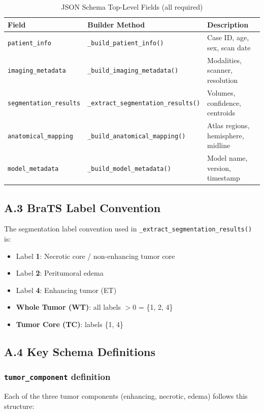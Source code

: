 \documentclass[conference]{IEEEtran}
\begin{document}
\begin{table}[htbp]
\caption{JSON Schema Top-Level Fields (all required)}
\begin{center}
\begin{tabular}{l l p{3.8cm}}
\toprule
\textbf{Field} & \textbf{Builder Method} & \textbf{Description} \\
\midrule
\texttt{patient\_info}       & \texttt{\_build\_patient\_info()}       & Case ID, age, sex, scan date \\
\texttt{imaging\_metadata}   & \texttt{\_build\_imaging\_metadata()}   & Modalities, scanner, resolution \\
\texttt{segmentation\_results} & \texttt{\_extract\_segmentation\_results()} & Volumes, confidence, centroids \\
\texttt{anatomical\_mapping} & \texttt{\_build\_anatomical\_mapping()} & Atlas regions, hemisphere, midline \\
\texttt{model\_metadata}     & \texttt{\_build\_model\_metadata()}     & Model name, version, timestamp \\
\bottomrule
\end{tabular}
\label{tab:schema_top}
\end{center}
\end{table}

\subsection*{A.3 BraTS Label Convention}

The segmentation label convention used in \texttt{\_extract\_segmentation\_results()} is:

\begin{itemize}
    \item Label \textbf{1}: Necrotic core / non-enhancing tumor core
    \item Label \textbf{2}: Peritumoral edema
    \item Label \textbf{4}: Enhancing tumor (ET)
    \item \textbf{Whole Tumor (WT)}: all labels $> 0$ = \{1, 2, 4\}
    \item \textbf{Tumor Core (TC)}: labels \{1, 4\}
\end{itemize}

\subsection*{A.4 Key Schema Definitions}

\subsubsection*{\texttt{tumor\_component} definition}
Each of the three tumor components (enhancing, necrotic, edema) follows this structure:
\end{document}
